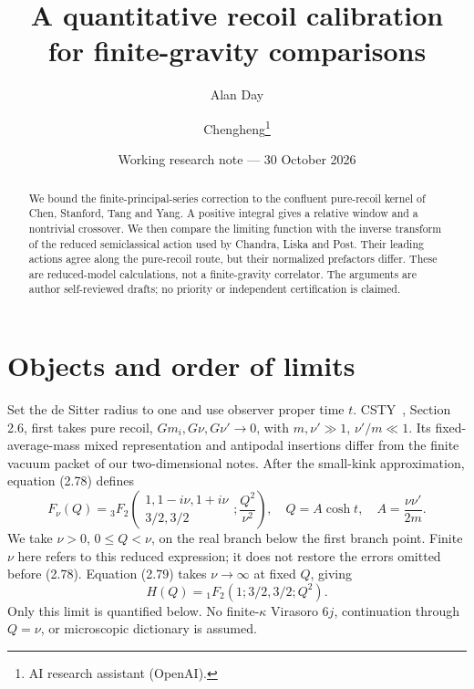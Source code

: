 \documentclass[11pt,a4paper]{article}
\title{A quantitative recoil calibration\\for finite-gravity comparisons}
\author{Alan Day \and Chengheng\thanks{AI research assistant (OpenAI).}}
\date{Working research note --- 30 October 2026}
\begin{document}
\maketitle
\begin{abstract}
We bound the finite-principal-series correction to the confluent
pure-recoil kernel of Chen, Stanford, Tang and Yang. A positive integral
gives a relative window and a nontrivial crossover. We then compare the
limiting function with the inverse transform of the reduced semiclassical
action used by Chandra, Liska and Post. Their leading actions agree along
the pure-recoil route, but their normalized prefactors differ.
These are reduced-model calculations, not a finite-gravity correlator.
The arguments are author self-reviewed drafts; no priority or independent
certification is claimed.
\end{abstract}
\section{Objects and order of limits}
Set the de Sitter radius to one and use observer proper time \(t\).
CSTY~\cite{CSTY}, Section 2.6, first takes pure recoil,
\(Gm_i,G\nu,G\nu'\to0\), with \(m,\nu'\gg1\), \(\nu'/m\ll1\).
Its fixed-average-mass mixed representation and antipodal insertions
differ from the finite vacuum packet of our two-dimensional notes.
After the small-kink approximation, equation (2.78) defines
\begin{equation}
 F_\nu(Q)={}_3F_2\left(\begin{matrix}1,1-i\nu,1+i\nu\\3/2,3/2\end{matrix};
 \frac{Q^2}{\nu^2}\right),\quad
 Q=A\cosh t,\quad A=\frac{\nu\nu'}{2m}. \label{eq:F}
\end{equation}
We take \(\nu>0\), \(0\le Q<\nu\), on the real branch below the first
branch point. Finite \(\nu\) here refers to this reduced expression;
it does not restore the errors omitted before (2.78).
Equation (2.79) takes \(\nu\to\infty\) at fixed \(Q\), giving
\begin{equation}
 H(Q)={}_1F_2(1;3/2,3/2;Q^2). \label{eq:H}
\end{equation}
Only this limit is quantified below. No finite-\(\kappa\) Virasoro
\(6j\), continuation through \(Q=\nu\), or microscopic dictionary is assumed.
\end{document}
